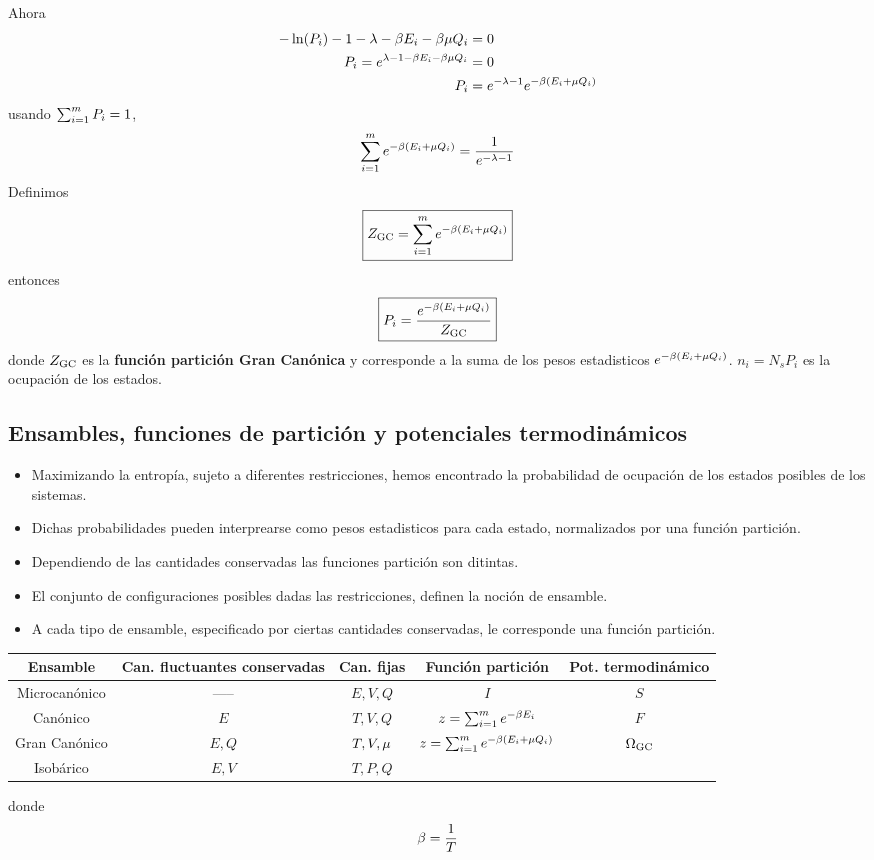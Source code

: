 Ahora
\begin{align}
  -\ln(P_i)-1-\lambda-\beta E_i-\beta\mu Q_i&=0\\
  P_i=e^{\lambda-1-\beta E_i-\beta\mu Q_i}&=0\\
  P_i&=e^{-\lambda-1}e^{-\beta(E_i+\mu Q_i)}
\end{align}
usando $\sum_{i=1}^m P_i=1$,
\begin{align}
  \sum_{i=1}^m e^{-\beta (E_i+\mu Q_i)}=\frac{1}{e^{-\lambda-1}}
\end{align}
Definimos
\begin{equation}
\boxed{  Z_{\rm GC}=\sum_{i=1}^m e^{-\beta (E_i+\mu Q_i)}}
\end{equation}
entonces
\begin{equation}
 \boxed{ P_i=\frac{e^{-\beta (E_i+\mu Q_i)}}{Z_{\rm GC}}}
\end{equation}
donde $Z_{\rm GC}$ es la \textbf{función partición Gran Canónica} y corresponde a la suma de los pesos estadisticos $e^{-\beta (E_i+\mu Q_i)}$. $n_i=N_sP_i$ es la ocupación de los estados.

\subsection{Ensambles, funciones de partición y potenciales termodinámicos}
\begin{itemize}
	\item Maximizando la entropía, sujeto a diferentes restricciones, hemos encontrado la probabilidad de ocupación de los estados posibles de los sistemas.
	\item Dichas probabilidades pueden interprearse como pesos estadisticos para cada estado, normalizados por una función partición.
	\item Dependiendo de las cantidades conservadas las funciones partición son ditintas.
	\item El conjunto de configuraciones posibles dadas las restricciones, definen la noción de ensamble.
	\item A cada tipo de ensamble, especificado por ciertas cantidades conservadas, le corresponde una función partición.
\end{itemize}


\begin{center}
\begin{tabular}{|c|c|c|c|c|}
\hline
  Ensamble & Can. fluctuantes conservadas & Can. fijas & Función partición & Pot. termodinámico  \\
  \hline\hline
  Microcanónico & ----- & $E,V,Q$& $I$& $S$ \\\hline
  Canónico&$E$ &$T,V,Q$&$z=\sum_{i=1}^m e^{-\beta E_i}$&$F$\\\hline
  Gran Canónico&$E,Q$&$T,V,\mu$&$z=\sum_{i=1}^m e^{-\beta(E_i+\mu Q_i)}$&$\Omega_{\rm GC}$\\\hline
  Isobárico&$E,V$&$T,P,Q$&&\\\hline
\end{tabular}
\end{center}
donde
\begin{equation}
  \beta=\frac{1}{T}
\end{equation}

